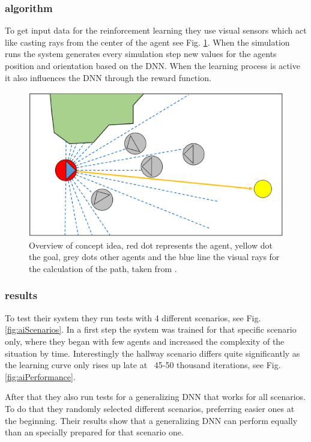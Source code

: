 \documentclass[sigconf]{acmart}
\begin{document}
\subsubsection{algorithm}
To get input data for the reinforcement learning they use visual sensors which act like casting rays from the center of the agent see Fig. \ref{fig:aiConceptOverview}. When the simulation runs the system generates every simulation step new values for the agents position and orientation based on the DNN. When the learning process is active it also influences the DNN through the reward function.
\begin{figure}[h]
  \centering
  \includegraphics[width=1\linewidth]{images/aiAlgortihmn.png}
  \caption{Overview of concept idea, red dot represents the agent, yellow dot the goal, grey dots other agents and the blue line the visual rays for the calculation of the path, taken from \cite{lee_crowd_2018}.}
  \label{fig:aiConceptOverview}
\end{figure}

\subsubsection{results}
To test their system they run tests with 4 different scenarios, see Fig. \ref{fig:aiScenarios}. In a first step the system was trained for that specific scenario only, where they began with few agents and increased the complexity of the situation by time. Interestingly the hallway scenario differs quite significantly as the learning curve only rises up late at ~45-50 thousand iterations, see Fig. \ref{fig:aiPerformance}.

After that they also run tests for a generalizing DNN that works for all scenarios. To do that they randomly selected different scenarios, preferring easier ones at the beginning. Their results show that a generalizing DNN can perform equally than an specially prepared for that scenario one. 
\end{document}
